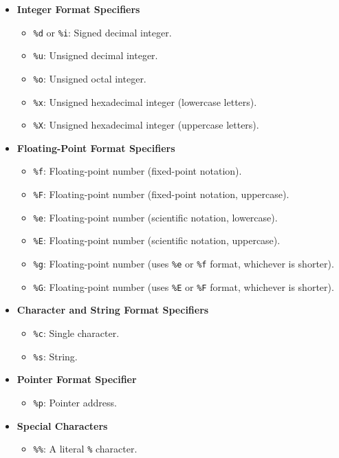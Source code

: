 \documentclass{report}
\begin{document}
    \begin{itemize}
    \item \textbf{Integer Format Specifiers}
    \begin{itemize}
        \item \verb|%d| or \verb|%i|: Signed decimal integer.
        \item \verb|%u|: Unsigned decimal integer.
        \item \verb|%o|: Unsigned octal integer.
        \item \verb|%x|: Unsigned hexadecimal integer (lowercase letters).
        \item \verb|%X|: Unsigned hexadecimal integer (uppercase letters).
    \end{itemize}
    
    \item \textbf{Floating-Point Format Specifiers}
    \begin{itemize}
        \item \verb|%f|: Floating-point number (fixed-point notation).
        \item \verb|%F|: Floating-point number (fixed-point notation, uppercase).
        \item \verb|%e|: Floating-point number (scientific notation, lowercase).
        \item \verb|%E|: Floating-point number (scientific notation, uppercase).
        \item \verb|%g|: Floating-point number (uses \verb|%e| or \verb|%f| format, whichever is shorter).
        \item \verb|%G|: Floating-point number (uses \verb|%E| or \verb|%F| format, whichever is shorter).
    \end{itemize}
    
    \item \textbf{Character and String Format Specifiers}
    \begin{itemize}
        \item \verb|%c|: Single character.
        \item \verb|%s|: String.
    \end{itemize}
    
    \item \textbf{Pointer Format Specifier}
    \begin{itemize}
        \item \verb|%p|: Pointer address.
    \end{itemize}
    
    \item \textbf{Special Characters}
    \begin{itemize}
        \item \verb|%%|: A literal \verb|%| character.
    \end{itemize}
    

\end{itemize}
\end{document}

